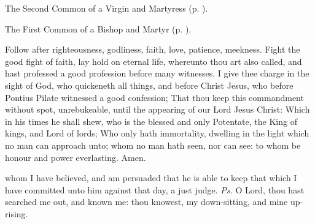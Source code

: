 
\begin{rubric}
	The Second Common of a Virgin and Martyress (p. \pageref{CommonVirginMartyrII}).
\end{rubric}



\begin{rubric}
	The First Common of a Bishop and Martyr (p. \pageref{CommonMartyrBishopI}).
\end{rubric}

\vspace{-0.15\baselineskip}


\vspace{-0.1\baselineskip}

 Follow after righteousness, godliness, faith, love, patience, meekness. Fight the good fight of faith, lay hold on eternal life, whereunto thou art also called, and hast professed a good profession before many witnesses. I give thee charge in the sight of God, who quickeneth all things, and before Christ Jesus, who before Pontius Pilate witnessed a good confession; That thou keep this commandment without spot, unrebukeable, until the appearing of our Lord Jesus Christ: Which in his times he shall shew, who is the blessed and only Potentate, the King of kings, and Lord of lords; Who only hath immortality, dwelling in the light which no man can approach unto; whom no man hath seen, nor can see: to whom be honour and power everlasting. Amen.



\vspace{-0.25\baselineskip}

\introit

\vspace{-0.1\baselineskip}

 whom I have believed, and am persuaded that he is able to keep that which I have committed unto him against that day, a just judge. \textit{Ps.} O Lord, thou hast searched me out, and known me: thou knowest, my down-sitting, and mine up-rising.

